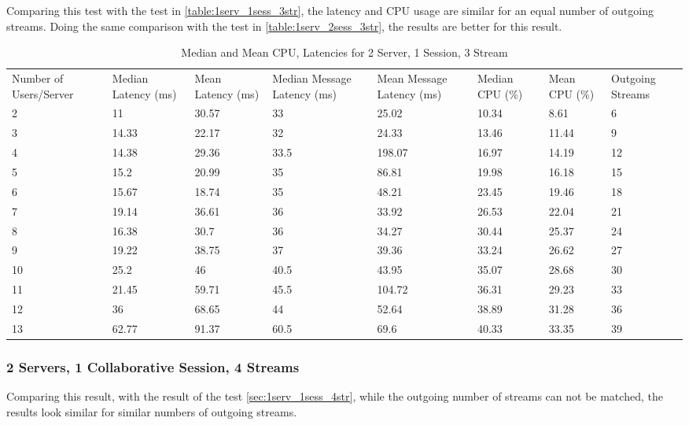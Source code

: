 Comparing this test with the test in \ref{table:1serv_1sess_3str}, the latency and CPU usage are similar for an equal number of outgoing streams. Doing the same comparison with the test in \ref{table:1serv_2sess_3str}, the results are better for this result.

\begin{table}
\caption{Median and Mean CPU, Latencies for 2 Server, 1 Session, 3 Stream}
\label{table:2serv_1sess_3str}
\begin{tabu} to\linewidth{|X[c]|X[c]|X[c]|X[c]|X[c]|X[c]|X[c]|X[c]|}
\everyrow{\hline}
\hline
Number of Users/Server & Median Latency (ms) & Mean Latency (ms) & Median Message Latency (ms) & Mean Message Latency (ms) & Median CPU (\%) & Mean CPU (\%) & Outgoing Streams\\
2 & 11 & 30.57 & 33 & 25.02 & 10.34 & 8.61 & 6 \\
3 & 14.33 & 22.17 & 32 & 24.33 & 13.46 & 11.44 & 9 \\
4 & 14.38 & 29.36 & 33.5 & 198.07 & 16.97 & 14.19 & 12 \\
5 & 15.2 & 20.99 & 35 & 86.81 & 19.98 & 16.18 & 15 \\
6 & 15.67 & 18.74 & 35 & 48.21 & 23.45 & 19.46 & 18 \\
7 & 19.14 & 36.61 & 36 & 33.92 & 26.53 & 22.04 & 21 \\
8 & 16.38 & 30.7 & 36 & 34.27 & 30.44 & 25.37 & 24 \\
9 & 19.22 & 38.75 & 37 & 39.36 & 33.24 & 26.62 & 27 \\
10 & 25.2 & 46 & 40.5 & 43.95 & 35.07 & 28.68 & 30 \\
11 & 21.45 & 59.71 & 45.5 & 104.72 & 36.31 & 29.23 & 33 \\
12 & 36 & 68.65 & 44 & 52.64 & 38.89 & 31.28 & 36 \\
13 & 62.77 & 91.37 & 60.5 & 69.6 & 40.33 & 33.35 & 39 \\
\end{tabu}
\end{table}

\clearpage\subsubsection{2 Servers, 1 Collaborative Session, 4 Streams}

Comparing this result, with the result of the test \ref{sec:1serv_1sess_4str}, while the outgoing number of streams can not be matched, the results look similar for similar numbers of outgoing streams.

